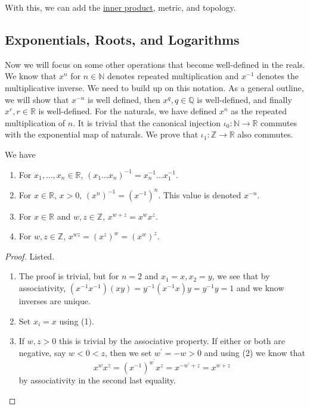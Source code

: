   With this, we can add the \hyperref[lin-def:inner-product]{inner product}, metric, and topology. 

\subsection{Exponentials, Roots, and Logarithms} 

  Now we will focus on some other operations that become well-defined in the reals. We know that $x^{n}$ for $n \in \mathbb{N}$ denotes repeated multiplication and $x^{-1}$ denotes the multiplicative inverse. We need to build up on this notation. As a general outline, we will show that $x^{-n}$ is well defined, then $x^q, q \in \mathbb{Q}$ is well-defined, and finally $x^r, r \in \mathbb{R}$ is well-defined. For the naturals, we have defined $x^n$ as the repeated multiplication of $n$. It is trivial that the canonical injection $\iota_0: \mathbb{N} \rightarrow \mathbb{R}$ commutes with the exponential map of naturals. We prove that $\iota_1: \mathbb{Z} \rightarrow \mathbb{R}$ also commutes. 

  \begin{lemma}
    \label{thm:integer-exponents}
    We have 
    \begin{enumerate}
      \item For $x_1, \ldots, x_n \in \mathbb{R}$, $(x_1 \ldots x_n)^{-1} = x_n^{-1} \ldots x_1^{-1}$. 
      \item For $x \in \mathbb{R}$, $x > 0$, $(x^n)^{-1} = (x^{-1})^n$. This value is denoted $x^{-n}$. 
      \item For $x \in \mathbb{R}$ and $w, z \in \mathbb{Z}$, $x^{w + z} = x^w x^z$. 
      \item For $w, z \in \mathbb{Z}$, $x^{wz} = (x^z)^w = (x^w)^z$. 
    \end{enumerate}
  \end{lemma}
  \begin{proof}
    Listed. 
    \begin{enumerate}
      \item The proof is trivial, but for $n = 2$ and $x_1 = x, x_2 = y$, we see that by associativity, $(x^{-1} x^{-1}) (x y) = y^{-1} (x^{-1} x) y = y^{-1} y = 1$ and we know inverses are unique. 
      \item Set $x_i = x$ using (1). 
      \item If $w, z > 0$ this is trivial by the associative property. If either or both are negative, say $w < 0 < z$, then we set $w^\prime = -w > 0$ and using (2) we know that 
      \begin{equation}
        x^{w} x^{z} = (x^{-1})^{w^\prime} x^z = x^{-w^\prime + z} = x^{w + z}
      \end{equation}
      by associativity in the second last equality. 
    \end{enumerate}
  \end{proof}

